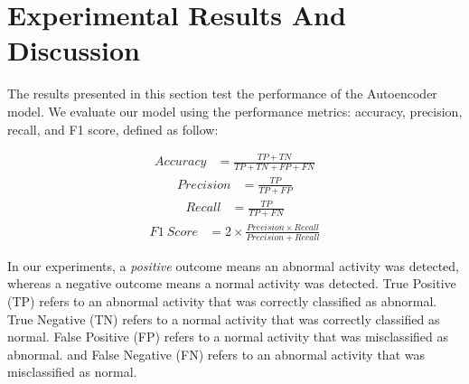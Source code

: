 \section{Experimental Results And Discussion}
\label{sec:results}
The results presented in this section test the performance of the Autoencoder model. We evaluate our model using the performance metrics: accuracy, precision, recall, and F1 score, defined as follow: 

\vspace{-5mm}
\begin{align*}
    Accuracy &= \frac{TP+TN}{TP+TN+FP+FN}
\end{align*}
\vspace{-3mm}
\begin{align*}
    Precision &= \frac{TP}{TP+FP}
\end{align*}
\vspace{-3mm}
\begin{align*}
    Recall &= \frac{TP}{TP+FN}
\end{align*}
\vspace{-3mm}
\begin{align*}
    F1 ~Score &= 2 \times \frac{Precision \times Recall}{Precision + Recall}
\end{align*}

In our experiments, a \textit{positive} outcome means an abnormal activity was detected, whereas a negative outcome means a normal activity was detected.
True Positive (TP) refers to an abnormal activity that was correctly classified as abnormal. 
True Negative (TN) refers to a normal activity that was correctly classified as normal.
False Positive (FP) refers to a normal activity that was misclassified as abnormal.
and False Negative (FN) refers to an abnormal activity that was misclassified as normal.

